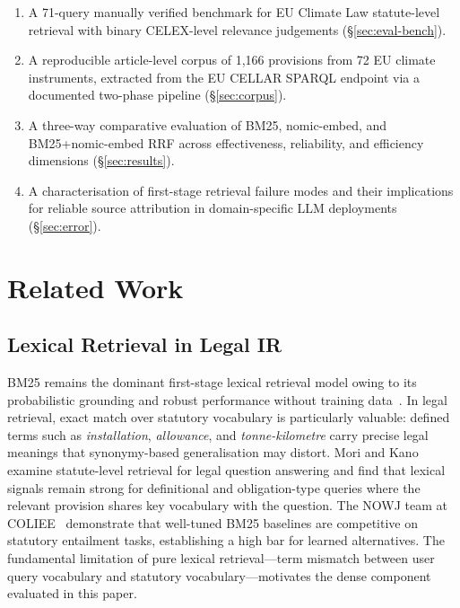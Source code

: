 \documentclass[sigconf,screen]{acmart}
\newcommand{\nomicshort}{nomic-embed\xspace}
\newcommand{\rrf}{RRF\xspace}
\begin{document}
\begin{enumerate}
  \item A 71-query manually verified benchmark for EU Climate Law
    statute-level retrieval with binary CELEX-level relevance
    judgements (\S\ref{sec:eval-bench}).
  \item A reproducible article-level corpus of 1{,}166 provisions
    from 72 EU climate instruments, extracted from the EU CELLAR
    SPARQL endpoint via a documented two-phase pipeline
    (\S\ref{sec:corpus}).
  \item A three-way comparative evaluation of BM25, \nomicshort, and
    BM25{+}\nomicshort \rrf across effectiveness, reliability, and
    efficiency dimensions (\S\ref{sec:results}).
  \item A characterisation of first-stage retrieval failure modes
    and their implications for reliable source attribution in
    domain-specific LLM deployments (\S\ref{sec:error}).
\end{enumerate}

\section{Related Work}
\label{sec:related}

\subsection{Lexical Retrieval in Legal IR}
\label{sec:related-lexical}

BM25 remains the dominant first-stage lexical retrieval model owing
to its probabilistic grounding and robust performance without
training data~\cite{robertson2009bm25}.  In legal retrieval, exact
match over statutory vocabulary is particularly valuable: defined
terms such as \textit{installation}, \textit{allowance}, and
\textit{tonne-kilometre} carry precise legal meanings that
synonymy-based generalisation may distort.  Mori and
Kano~\cite{mori2023} examine statute-level retrieval for legal
question answering and find that lexical signals remain strong for
definitional and obligation-type queries where the relevant provision
shares key vocabulary with the question.  The NOWJ team at
COLIEE~\cite{nowjcoliee2023} demonstrate that well-tuned BM25
baselines are competitive on statutory entailment tasks, establishing
a high bar for learned alternatives.  The fundamental limitation of
pure lexical retrieval---term mismatch between user query vocabulary
and statutory vocabulary---motivates the dense component evaluated in
this paper.
\end{document}
